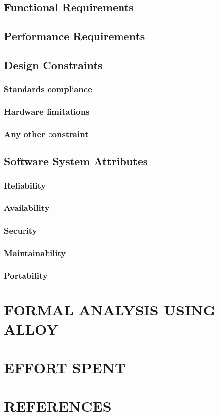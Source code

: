 \documentclass{report}
\begin{document}
		\section{Functional Requirements}
		\section{Performance Requirements}
		\section{Design Constraints}
			\subsection{Standards compliance}
			\subsection{Hardware limitations}
			\subsection{Any other constraint}
		\section{Software System Attributes}
			\subsection{Reliability}
			\subsection{Availability}
			\subsection{Security}
			\subsection{Maintainability}
			\subsection{Portability}
	\chapter{FORMAL ANALYSIS USING ALLOY}
	\chapter{EFFORT SPENT}
	\chapter{REFERENCES}
\end{document}
